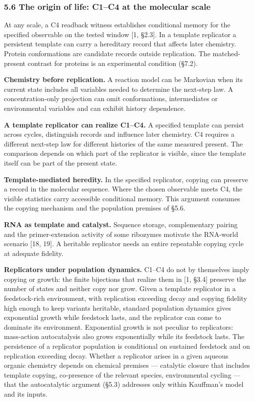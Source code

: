 \documentclass[
]{article}
\begin{document}
\hypertarget{the-origin-of-life-c1c4-at-the-molecular-scale}{%
\subsubsection{5.6 The origin of life: C1--C4 at the molecular
scale}\label{the-origin-of-life-c1c4-at-the-molecular-scale}}

At any scale, a C4 readback witness establishes conditional memory for
the specified observable on the tested window {[}1, §2.3{]}. In a
template replicator a persistent template can carry a hereditary record
that affects later chemistry. Protein conformations are candidate
records outside replication. The matched-present contrast for proteins
is an experimental condition (§7.2).

\textbf{Chemistry before replication.} A reaction model can be Markovian
when its current state includes all variables needed to determine the
next-step law. A concentration-only projection can omit conformations,
intermediates or environmental variables and can exhibit history
dependence.

\textbf{A template replicator can realize C1--C4.} A specified template
can persist across cycles, distinguish records and influence later
chemistry. C4 requires a different next-step law for different histories
of the same measured present. The comparison depends on which part of
the replicator is visible, since the template itself can be part of the
present state.

\textbf{Template-mediated heredity.} In the specified replicator,
copying can preserve a record in the molecular sequence. Where the
chosen observable meets C4, the visible statistics carry accessible
conditional memory. This argument consumes the copying mechanism and the
population premises of §5.6.

\textbf{RNA as template and catalyst.} Sequence storage, complementary
pairing and the primer-extension activity of some ribozymes motivate the
RNA-world scenario {[}18, 19{]}. A heritable replicator needs an entire
repeatable copying cycle at adequate fidelity.

\textbf{Replicators under population dynamics.} C1--C4 do not by
themselves imply copying or growth: the finite bijections that realize
them in {[}1, §3.4{]} preserve the number of states and neither copy nor
grow. Given a template replicator in a feedstock-rich environment, with
replication exceeding decay and copying fidelity high enough to keep
variants heritable, standard population dynamics gives exponential
growth while feedstock lasts, and the replicator can come to dominate
its environment. Exponential growth is not peculiar to replicators:
mass-action autocatalysis also grows exponentially while its feedstock
lasts. The persistence of a replicator population is conditional on
sustained feedstock and on replication exceeding decay. Whether a
replicator arises in a given aqueous organic chemistry depends on
chemical premises --- catalytic closure that includes template copying,
co-presence of the relevant species, environmental cycling --- that the
autocatalytic argument (§5.3) addresses only within Kauffman's model and
its inputs.
\end{document}
